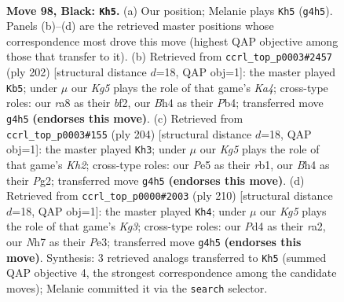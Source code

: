 \documentclass[11pt]{article}
\begin{document}
\clearpage

\begin{figure}[p]\centering
\begin{subfigure}{0.46\textwidth}\centering
\resizebox{\linewidth}{!}{%
\newchessgame
\chessboard[
  setfen={R7/7n/7p/1K2p3/3p2kb/2r5/8/8 b - - 15 98},
  showmover=false,
  pgfstyle=straightmove, color=movearrow, markmove={g4-h5}
]}
\caption{}
\end{subfigure}\hfill
\begin{subfigure}{0.46\textwidth}\centering
\resizebox{\linewidth}{!}{%
\newchessgame
\chessboard[
  setfen={3k4/8/3pP3/3P3B/KP6/8/5b2/8 w - - 13 102},
  showmover=false,
  pgfstyle=straightmove, color=movearrow, markmove={a4-b5}
]}
\caption{}
\end{subfigure}
\\[4pt]
\begin{subfigure}{0.46\textwidth}\centering
\resizebox{\linewidth}{!}{%
\newchessgame
\chessboard[
  setfen={3R4/8/5k2/8/5p2/5P2/6PK/1r6 w - - 13 103},
  showmover=false,
  pgfstyle=straightmove, color=movearrow, markmove={h2-h3}
]}
\caption{}
\end{subfigure}\hfill
\begin{subfigure}{0.46\textwidth}\centering
\resizebox{\linewidth}{!}{%
\newchessgame
\chessboard[
  setfen={8/6k1/1R6/5p2/5P2/4P1K1/r7/8 w - - 89 106},
  showmover=false,
  pgfstyle=straightmove, color=movearrow, markmove={g3-h4}
]}
\caption{}
\end{subfigure}
\caption{\textbf{Move 98, Black: \texttt{Kh5}.} (a) Our position; Melanie plays \texttt{Kh5} (\texttt{g4h5}). Panels (b)--(d) are the retrieved master positions whose correspondence most drove this move (highest QAP objective among those that transfer to it). (b) Retrieved from \texttt{ccrl\_top\_p0003\#2457} (ply 202) [structural distance $d$=18, QAP obj=1]: the master played \texttt{Kb5}; under $\mu$ our \emph{Kg5} plays the role of that game's \emph{Ka4}; cross-type roles: our \emph{r}a8 as their \emph{b}f2, our \emph{B}h4 as their \emph{P}b4; transferred move \texttt{g4h5} \textbf{(endorses this move)}. (c) Retrieved from \texttt{ccrl\_top\_p0003\#155} (ply 204) [structural distance $d$=18, QAP obj=1]: the master played \texttt{Kh3}; under $\mu$ our \emph{Kg5} plays the role of that game's \emph{Kh2}; cross-type roles: our \emph{P}e5 as their \emph{r}b1, our \emph{B}h4 as their \emph{P}g2; transferred move \texttt{g4h5} \textbf{(endorses this move)}. (d) Retrieved from \texttt{ccrl\_top\_p0000\#2003} (ply 210) [structural distance $d$=18, QAP obj=1]: the master played \texttt{Kh4}; under $\mu$ our \emph{Kg5} plays the role of that game's \emph{Kg3}; cross-type roles: our \emph{P}d4 as their \emph{r}a2, our \emph{N}h7 as their \emph{P}e3; transferred move \texttt{g4h5} \textbf{(endorses this move)}. Synthesis: 3 retrieved analogs transferred to \texttt{Kh5} (summed QAP objective 4, the strongest correspondence among the candidate moves); Melanie committed it via the \texttt{search} selector.}
\label{fig:thought-m195}
\end{figure}
\end{document}
